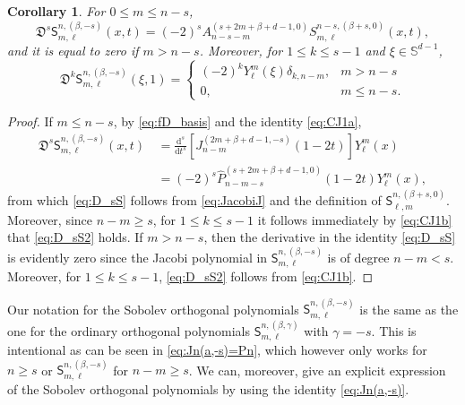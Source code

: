 \documentclass{amsart}
\newtheorem{cor}[thm]{Corollary}
\theoremstyle{remark}
\def\d{\mathrm{d}}
\def\sph{{\mathbb{S}^{d-1}}}
\def\sS{{\mathsf S}}
\def\fD{{\mathfrak D}}
\def\b{{\beta}}
\def\g{{\gamma}}
\newcommand{\wh}{\widehat}
\begin{document}
\begin{cor}\label{cor:der_sS}
For $0 \le m \le n-s$,
\begin{equation} \label{eq:D_sS}
 \fD^s \sS_{m,\ell}^{n, (\b,-s)}(x,t) = (-2)^s A_{n-s-m}^{(s+2m+\b+d-1,0)} S_{m,\ell}^{n-s, (\b+s,0)}(x,t),
\end{equation}
and it is equal to zero if $m > n-s$. Moreover, for $1 \le k \le s-1$ and $\xi \in \sph$,
\begin{equation} \label{eq:D_sS2}
    \fD^k  \sS_{m,\ell}^{n, (\b,-s)}(\xi,1) = \begin{cases}
         (-2)^k Y_\ell^m(\xi) \delta_{k,n-m}, & m > n-s \\
         0, & m \le n-s.
     \end{cases}
\end{equation}
\end{cor}

\begin{proof}
If $m \le n-s$, by \eqref{eq:fD_basis} and the identity \eqref{eq:CJ1a},
\begin{align*}
\fD^s \sS_{m,\ell}^{n, (\b,-s)}(x,t)  \,&  =
     \frac{\d^s}{\d t^s}\left[J_{n-m}^{(2m+\b+d-1,-s)}(1-2t)\right]Y_\ell^m(x) \\
   & = (-2)^{s} \wh P_{n-m-s}^{(s+2m+\b+d-1,0)}(1-2t)Y_\ell^m(x),
\end{align*}
from which \eqref{eq:D_sS} follows from \eqref{eq:JacobiJ} and the definition of $\sS_{\ell,m}^{n,(\b+s,0)}$.
Moreover, since $n-m \ge s$, for $1 \le k \le s-1$ it follows immediately by \eqref{eq:CJ1b} that \eqref{eq:D_sS2}
holds. If $m > n-s$, then the derivative in the identity \eqref{eq:D_sS} is evidently zero since the Jacobi polynomial
in $\sS_{m,\ell}^{n, (\b,-s)}$ is of degree $n-m <s$. Moreover, for $1 \le k \le s-1$, \eqref{eq:D_sS2} follows
from \eqref{eq:CJ1b}.
\end{proof}

Our notation for the Sobolev orthogonal polynomials $\sS_{m,\ell}^{n,(\b,-s)}$ is the same as the one
for the ordinary orthogonal polynomials $\sS_{m,\ell}^{n,(\b,\g)}$ with $\g = -s$. This is intentional as can be
seen in \eqref{eq:Jn(a,-s)=Pn}, which however only works for $n \ge s$ or $\sS_{m,\ell}^{n,(\b,-s)}$ for
$n-m \ge s$. We can, moreover, give an explicit expression of the Sobolev orthogonal polynomials by
using the identity \eqref{eq:Jn(a,-s)}.
\end{document}
